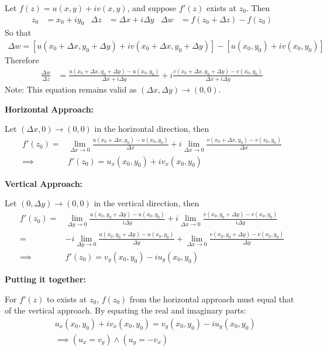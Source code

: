 \documentclass[12pt, english]{book}
\makeatletter
\renewenvironment{proof}[1][\proofname]{\par
	\pushQED{\qed}%
	\normalfont \topsep6\p@\@plus6\p@\relax
	\list{}{%
		\settowidth{\leftmargin}{\itshape\proofname:\hskip\labelsep}%
		\setlength{\labelwidth}{0pt}%
		\setlength{\itemindent}{-\leftmargin}%
	}%
	\item[\hskip\labelsep\itshape#1\@addpunct{:}]\ignorespaces
	}{ \popQED\endlist\@endpefalse}
\makeatother
\begin{document}
	\begin{proof}
		Let \(f(z) = u(x,y) + iv(x,y)\), and suppose $f'(z)$ exists at $z_0$. Then 
		\begin{align*}
			z_0 &= x_0 + iy_0	&	\Delta z &= \Delta x + i\Delta y
			&	\Delta w &= f(z_0 + \Delta z) - f(z_0)
		\end{align*}
		So that
		\begin{align*}
			\Delta w = [u(x_0 + \Delta x, y_0 + \Delta y) + iv(x_0 + \Delta x, y_0 + \Delta y)] - [u(x_0, y_0) + iv(x_0, y_0)]
		\end{align*}
		Therefore
		\begin{align*}
			\frac{\Delta w}{\Delta z}
			&= \frac{u(x_0 + \Delta x, y_0 + \Delta y) - u(x_0, y_0)}{\Delta x + i\Delta y} + i\frac{v(x_0 + \Delta x, y_0 + \Delta y) - v(x_0, y_0)}{\Delta x + i\Delta y}
		\end{align*}
		Note: This equation remains valid as \((\Delta x, \Delta y) \rightarrow (0,0)\).
		
		\textbf{Horizontal Approach:}
		
		Let \((\Delta x, 0) \rightarrow (0,0)\) in the horizontal direction, then 
		\begin{align*}
			f'(z_0) 
			=& \lim_{\Delta x \rightarrow 0} \frac{u(x_0 + \Delta x, y_0) - u(x_0, y_0)}{\Delta x} + i \lim_{\Delta x \rightarrow 0} \frac{v(x_0 + \Delta x, y_0) - v(x_0, y_0)}{\Delta x} \\
			\implies& f'(z_0) = u_x(x_0, y_0) + iv_x(x_0, y_0)
		\end{align*}
		
		\textbf{Vertical Approach:}
		
		Let \((0, \Delta y) \rightarrow (0,0)\) in the vertical direction, then
		\begin{align*}
			f'(z_0) 
			=& \lim_{\Delta y \rightarrow 0} \frac{u(x_0, y_0 + \Delta y) - u(x_0, y_0)}{i \Delta y} + i \lim_{\Delta x \rightarrow 0} \frac{v(x_0, y_0+\Delta y) - v(x_0, y_0)}{i \Delta y} \\
			=& - i \lim_{\Delta y \rightarrow 0} \frac{u(x_0, y_0 + \Delta y) - u(x_0, y_0)}{ \Delta y} + \lim_{\Delta x \rightarrow 0} \frac{v(x_0, y_0+\Delta y) - v(x_0, y_0)}{\Delta y} \\
			\implies& f'(z_0) = v_y(x_0, y_0) - iu_y(x_0, y_0)
		\end{align*}
		
		\textbf{Putting it together:}
		
		For \(f'(z)\) to exists at \(z_0\), \(f(z_0)\) from the horizontal approach must equal that of the vertical approach. By equating the real and imaginary parts: 
		\begin{align*}
			&u_x(x_0, y_0) + iv_x(x_0, y_0) = v_y(x_0, y_0) - iu_y(x_0, y_0)\\
			&\implies (u_x = v_y) \land (u_y = - v_x)
		\end{align*}
		
	\end{proof}
	
\end{document}
